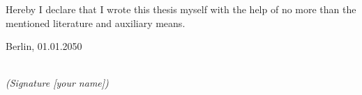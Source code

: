 \newpage

\thispagestyle{empty}

\begin{large}

\vspace*{6cm}

\noindent
Hereby I declare that I wrote this thesis myself with the help of no more than the mentioned literature and auxiliary means.
\vspace{2cm}

\noindent
Berlin, 01.01.2050

\vspace{3cm}

\hspace*{7cm}%
\dotfill\\
\hspace*{8.5cm}%
\textit{(Signature [your name])}

\end{large}
